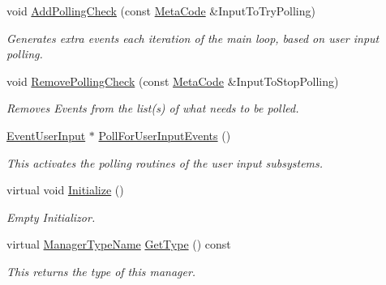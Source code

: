 \begin{DoxyCompactItemize}
void \hyperlink{classphys_1_1EventManager_a6ff66883358344908afd11204f79f196}{AddPollingCheck} (const \hyperlink{classphys_1_1MetaCode}{MetaCode} \&InputToTryPolling)
\begin{DoxyCompactList}\small\item\em Generates extra events each iteration of the main loop, based on user input polling. \item\end{DoxyCompactList}\item 
void \hyperlink{classphys_1_1EventManager_adaf7d5346932506ed43f893eb071fd39}{RemovePollingCheck} (const \hyperlink{classphys_1_1MetaCode}{MetaCode} \&InputToStopPolling)
\begin{DoxyCompactList}\small\item\em Removes Events from the list(s) of what needs to be polled. \item\end{DoxyCompactList}\item 
\hyperlink{classphys_1_1EventUserInput}{EventUserInput} $\ast$ \hyperlink{classphys_1_1EventManager_a983bc9f1933466491e6bf025b26a9023}{PollForUserInputEvents} ()
\begin{DoxyCompactList}\small\item\em This activates the polling routines of the user input subsystems. \item\end{DoxyCompactList}\item 
virtual void \hyperlink{classphys_1_1EventManager_a51afdd83f44f461dfac5c9eca5883ea0}{Initialize} ()
\begin{DoxyCompactList}\small\item\em Empty Initializor. \item\end{DoxyCompactList}\item 
virtual \hyperlink{classphys_1_1ManagerBase_aaa6ccddf23892eaccb898529414f80a5}{ManagerTypeName} \hyperlink{classphys_1_1EventManager_a194890f7f8be5d45aa98623481482696}{GetType} () const 
\begin{DoxyCompactList}\small\item\em This returns the type of this manager. \item\end{DoxyCompactList}\end{DoxyCompactItemize}


